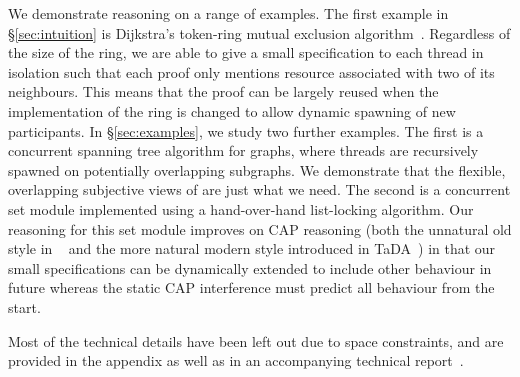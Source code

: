We demonstrate \colosl reasoning on a range of examples.  The first
example in \S\ref{sec:intuition} is Dijkstra's token-ring mutual
exclusion algorithm~\cite{dijkstra74}. Regardless of the size of the
ring, we are able to give a small specification to  each thread in
isolation such that  each proof only mentions resource
associated with two of its neighbours. This means that the proof can be largely reused when the
implementation of the ring is changed to allow dynamic spawning of new
participants.  In \S\ref{sec:examples}, we study two further
examples. The first is a concurrent spanning tree algorithm for
graphs, where threads are recursively spawned on potentially
overlapping subgraphs. We demonstrate that the flexible, overlapping
subjective views of \colosl are just what we need. 
The second is a concurrent set module implemented 
using a hand-over-hand
list-locking algorithm. Our \colosl reasoning  for this set module  improves
on CAP reasoning (both the unnatural old style in ~\cite{.} and the more natural
modern style introduced  in TaDA~\cite{.}) in that our small
specifications can be dynamically extended to include other behaviour
in future
whereas the  static CAP interference  must predict all behaviour from the start. 



Most of the technical details have been left out due to space
constraints, and are provided in the appendix as well as in an
accompanying technical report~\cite{colosl-tr14}.

